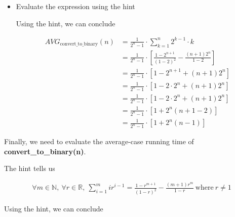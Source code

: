 \documentclass[12pt]{article}
\begin{document}
\begin{enumerate}[a.]
\begin{mdframed}
\begin{enumerate}[1.]
\begin{itemize}
\begin{mdframed}
            \end{mdframed}

            \item Evaluate the expression using the hint

            \begin{mdframed}

            Using the hint, we can conclude

            \begin{align}
                AVG_{\text{convert\_to\_binary}}(n) &= \frac{1}{2^n - 1} \cdot \sum\limits_{k = 1}^n 2^{k-1} \cdot k\\
                &= \frac{1}{2^n - 1} \cdot \left[ \frac{1 - 2^{n+1}}{(1-2)^2} - \frac{(n+1)2^n}{1-2} \right]\\
                &= \frac{1}{2^n - 1} \cdot \left[ 1 - 2^{n+1} + (n+1)2^n \right]\\
                &= \frac{1}{2^n - 1} \cdot \left[ 1 - 2 \cdot 2^n + (n+1)2^n \right]\\
                &= \frac{1}{2^n - 1} \cdot \left[ 1 - 2 \cdot 2^n + (n+1)2^n \right]\\
                &= \frac{1}{2^n - 1} \cdot \left[ 1 + 2^n(n+1 - 2) \right]\\
                &= \frac{1}{2^n - 1} \cdot \left[ 1 + 2^n(n-1) \right]
            \end{align}

            \end{mdframed}
        \end{itemize}

        \begin{mdframed}

            Finally, we need to evaluate the average-case running time of\\
            \textbf{convert\_to\_binary(n)}.

            \bigskip

            The hint tells us

            \begin{align}
                \forall m \in \mathbb{N},\:\forall r \in \mathbb{R},\:\sum\limits_{i=1}^m ir^{i-1} = \frac{1 - r^{m+1}}{(1-r)^2} - \frac{(m+1)r^m}{1-r}\:\text{where}\:r \neq 1
            \end{align}

            \bigskip

            Using the hint, we can conclude


\end{mdframed}
\end{enumerate}
\end{mdframed}
\end{enumerate}
\end{document}
